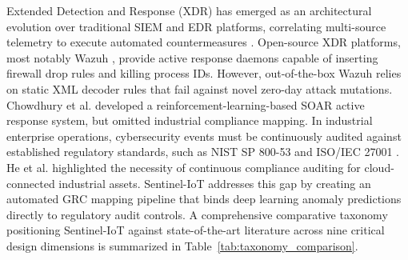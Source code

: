 \documentclass[11pt,a4paper]{article}
\begin{document}
Extended Detection and Response (XDR) has emerged as an architectural evolution over traditional SIEM and EDR platforms, correlating multi-source telemetry to execute automated countermeasures \cite{hassan2023xdr_survey, moustafa2023holistic_xdr}. Open-source XDR platforms, most notably Wazuh \cite{wazuh_ossec_study}, provide active response daemons capable of inserting firewall drop rules and killing process IDs. However, out-of-the-box Wazuh relies on static XML decoder rules that fail against novel zero-day attack mutations. Chowdhury et al. \cite{chowdhury2024soar_active} developed a reinforcement-learning-based SOAR active response system, but omitted industrial compliance mapping. In industrial enterprise operations, cybersecurity events must be continuously audited against established regulatory standards, such as NIST SP 800-53 \cite{nist_sp800_53} and ISO/IEC 27001 \cite{iso27001_2022}. He et al. \cite{he2024grc_automation} highlighted the necessity of continuous compliance auditing for cloud-connected industrial assets. Sentinel-IoT addresses this gap by creating an automated GRC mapping pipeline that binds deep learning anomaly predictions directly to regulatory audit controls. A comprehensive comparative taxonomy positioning Sentinel-IoT against state-of-the-art literature across nine critical design dimensions is summarized in Table~\ref{tab:taxonomy_comparison}.
\end{document}
